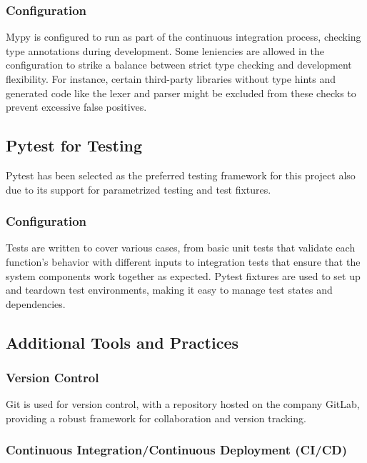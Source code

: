 \subsubsection{Configuration}
Mypy is configured to run as part of the continuous integration process, checking type annotations during development. Some leniencies are allowed in the configuration to strike a balance between strict type checking and development flexibility. For instance, certain third-party libraries without type hints and generated code like the lexer and parser might be excluded from these checks to prevent excessive false positives.

\subsection{Pytest for Testing}

Pytest\cite{pytest} has been selected as the preferred testing framework for this project also due to its support for parametrized testing and test fixtures.

\subsubsection{Configuration}

Tests are written to cover various cases, from basic unit tests that validate each function's behavior with different inputs to integration tests that ensure that the system components work together as expected. Pytest fixtures\cite{pytest_fixtures} are used to set up and teardown test environments, making it easy to manage test states and dependencies.

\subsection{Additional Tools and Practices}

\subsubsection{Version Control}

Git is used for version control, with a repository hosted on the company GitLab, providing a robust framework for collaboration and version tracking.

\subsubsection{Continuous Integration/Continuous Deployment (CI/CD)}

